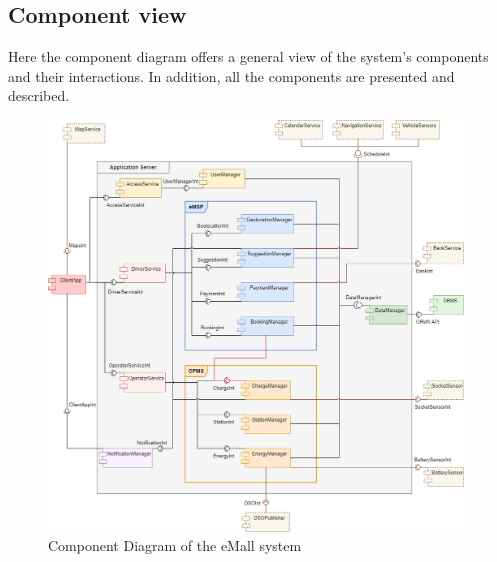 \documentclass[../main.tex]{subfiles}
\begin{document}
\subsection{Component view}
Here the component diagram offers a general view of the system's components and their interactions. In addition, all the components are presented and described. 
\begin{figure}[H]
    \centering
    \includegraphics[width=0.98\textwidth]{images/ComponentDiagram.png}
    \caption{Component Diagram of the eMall system}
    \label{fig:component}
\end{figure}
\end{document}
